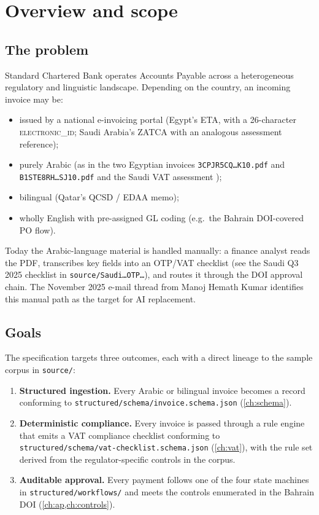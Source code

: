 \chapter{Overview and scope}\label{ch:overview}

\section{The problem}

Standard Chartered Bank operates Accounts Payable across a heterogeneous
regulatory and linguistic landscape. Depending on the country, an
incoming invoice may be:

\begin{itemize}
  \item issued by a national e-invoicing portal (Egypt's ETA, with a
        26-character \textsc{electronic\_id}; Saudi Arabia's ZATCA with
        an analogous assessment reference);
  \item purely Arabic (as in the two Egyptian invoices
        \texttt{3CPJR5CQ\ldots K10.pdf} and \texttt{B1STE8RH\ldots SJ10.pdf}
        and the Saudi VAT assessment );
  \item bilingual (Qatar's QCSD / EDAA memo);
  \item wholly English with pre-assigned GL coding (e.g.\ the Bahrain
        DOI-covered PO flow).
\end{itemize}

Today the Arabic-language material is handled manually: a finance analyst
reads the PDF, transcribes key fields into an OTP/VAT checklist (see the
Saudi Q3 2025 checklist in \corpus\texttt{source/Saudi\ldots OTP\ldots}),
and routes it through the DOI approval chain. The November 2025 e-mail
thread from Manoj Hemath Kumar identifies this manual path as the target
for AI replacement.

\section{Goals}

The specification targets three outcomes, each with a direct lineage to
the sample corpus in \corpus\texttt{source/}:

\begin{enumerate}
  \item \textbf{Structured ingestion.} Every Arabic or bilingual invoice
        becomes a record conforming to
        \texttt{structured/schema/invoice.schema.json}
        (\cref{ch:schema}).
  \item \textbf{Deterministic compliance.} Every invoice is passed
        through a rule engine that emits a VAT compliance checklist
        conforming to \texttt{structured/schema/vat-checklist.schema.json}
        (\cref{ch:vat}), with the rule set derived from the
        regulator-specific controls in the corpus.
  \item \textbf{Auditable approval.} Every payment follows one of the
        four state machines in \corpus\texttt{structured/workflows/} and
        meets the controls enumerated in the Bahrain DOI
        (\cref{ch:ap,ch:controls}).
\end{enumerate}

